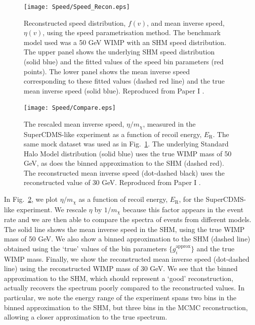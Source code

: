  \begin{figure}[t]
\centering
  \texttt{[image: Speed/Speed\_Recon.eps]}
\caption[Reconstructed speed distribution and mean inverse speed using the binned speed parametrisation]{Reconstructed speed distribution, $f(v)$, and mean inverse speed, $\eta(v)$, using the speed parametrisation method. The benchmark model used was a 50 GeV WIMP with an SHM speed distribution. The upper panel shows the underlying SHM speed distribution (solid blue) and the fitted values of the speed bin parameters (red points). The lower panel shows the mean inverse speed corresponding to these fitted values (dashed red line) and the true mean inverse speed (solid blue). Reproduced from Paper I \cite{Kavanagh:2012}.}
  \label{fig:Speed:Speed_Recon}
\end{figure}

 \begin{figure}[t]
\centering
  \texttt{[image: Speed/Compare.eps]}
\caption[Reconstructed mean inverse speed for the SuperCDMS-like experiment]{The rescaled mean inverse speed, \(\eta/m_\chi\), measured in the SuperCDMS-like experiment as a function of recoil energy, \(E_\textrm{R}\). The same mock dataset was used as in Fig.\ \ref{fig:Speed:Speed_Recon}. The underlying Standard Halo Model distribution (solid blue) uses the true WIMP mass of 50 GeV, as does the binned approximation to the SHM (dashed red). The reconstructed mean inverse speed (dot-dashed black) uses the reconstructed value of 30 GeV. Reproduced from Paper I \cite{Kavanagh:2012}.}
  \label{fig:Speed:Compare}
\end{figure}


In Fig.\ \ref{fig:Speed:Compare}, we plot \(\eta/m_\chi\) as a function of recoil energy, \(E_\textrm{R}\), for the SuperCDMS-like experiment. We rescale \(\eta\) by \(1/m_\chi\) because this factor appears in the event rate and we are then able to compare the spectra of events from different models. The solid line shows the mean inverse speed in the SHM, using the true WIMP mass of 50 GeV. We also show a binned approximation to the SHM (dashed line) obtained using the `true' values of the bin parameters \(\{g_i^\textrm{approx}\}\) and the true WIMP mass. Finally, we show the reconstructed mean inverse speed (dot-dashed line) using the reconstructed WIMP mass of 30 GeV. We see that the binned approximation to the SHM, which should represent a `good' reconstruction, actually recovers the spectrum poorly compared to the reconstructed values. In particular, we note the energy range of the experiment spans two bins in the binned approximation to the SHM, but three bins in the MCMC reconstruction, allowing a closer approximation to the true spectrum.

